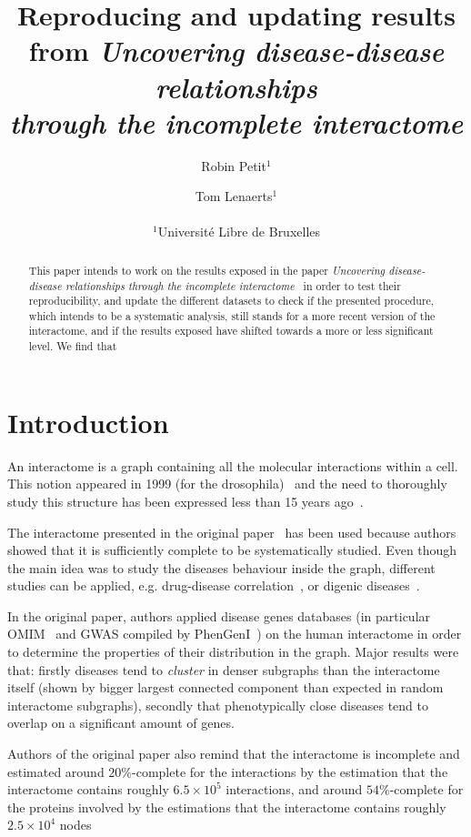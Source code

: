 \documentclass[letterpaper]{article}
\title{Reproducing and updating results from
\textit{Uncovering disease-disease relationships\\through the incomplete interactome}}
\author{Robin Petit$^{1}$ \and Tom Lenaerts$^{1}$\\
\mbox{}\\
$^1$Université Libre de Bruxelles}
\begin{document}
\maketitle

\begin{abstract}
  This paper intends to work on the results exposed in the paper \textit{Uncovering
	disease-disease relationships through the incomplete interactome}~\citep{originalPaper}
	in order to test their reproducibility, and update the different datasets to check if the
	presented procedure, which intends to be a systematic analysis, still stands for a more
	recent version of the interactome, and if the results exposed have shifted towards a more
	or less significant level. We find that
\end{abstract}

\section{Introduction}
An interactome is a graph containing all the molecular interactions within a cell. This notion appeared
in 1999 (for the drosophila)~\citep{sanchez1999grasping} and the need to thoroughly study this structure has
been expressed less than 15 years ago~\citep{UnderstandingTheCellFunctionalOrganization}.

The interactome presented in the original paper~\citep{originalPaper} has been used because authors showed that it is
sufficiently complete to be systematically studied. Even though the main idea was to study the diseases
behaviour inside the graph, different studies can be applied, e.g. drug-disease correlation~\citep{Yu2016extraction},
or digenic diseases~\citep{gazzo2015dida}.

In the original paper, authors applied disease genes databases (in particular OMIM~\citep{amberger2008OMIM}
and GWAS compiled by PhenGenI~\cite{ramos2014PhenGenI}) on the human interactome in order to determine
the properties of their distribution in the graph. Major results were that: firstly diseases tend to
\textit{cluster} in denser subgraphs than the interactome itself (shown by bigger largest connected
component than expected in random interactome subgraphs), secondly that phenotypically close diseases
tend to overlap on a significant amount of genes.

Authors of the original paper also remind that the interactome is incomplete and estimated around $20\%$-complete
for the interactions by the estimation that the interactome contains roughly $6.5 \times 10^5$ interactions,
and around $54\%$-complete for the proteins involved by the estimations that the interactome contains roughly
$2.5 \times 10^4$ nodes~\citep{ATruerMeasureOfOurIgnorance,estimatingTheSizeOfTheHumanInteractome}
\end{document}
